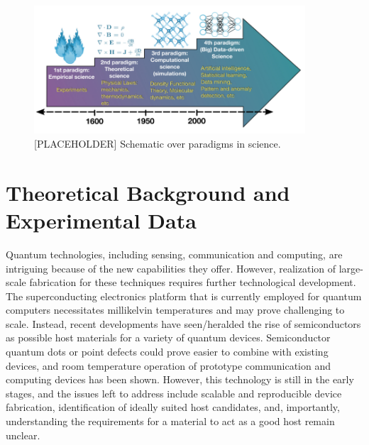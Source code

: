 \documentclass[superscriptaddress,unsortedaddress,
 amsmath,amssymb,
 aps,
]{revtex4-2}
\begin{document}
\begin{figure}[t]
    \centering
    \includegraphics[width=0.9\textwidth]{figures/paradigms.png}
    \caption{[PLACEHOLDER] Schematic over paradigms in science.}
    \label{fig:paradigm}
\end{figure}

\section*{Theoretical Background and Experimental Data} 


Quantum technologies, including sensing, communication and computing, 
are intriguing because of the new capabilities they offer. 
However, realization of large-scale fabrication for these techniques requires further technological development. 
The superconducting electronics platform that is currently employed for quantum computers necessitates millikelvin temperatures and may prove challenging to scale. 
Instead, recent developments have seen/heralded the rise of semiconductors as possible host materials for a variety of quantum devices. Semiconductor quantum dots or point defects could prove easier to combine with existing devices, and room temperature operation of prototype communication and computing devices has been shown.  
However, this technology is still in the early stages, and the issues left to address include scalable and reproducible device fabrication, identification of ideally suited host candidates, and, importantly, understanding the requirements for a material to act as a good host remain unclear. 
\end{document}
